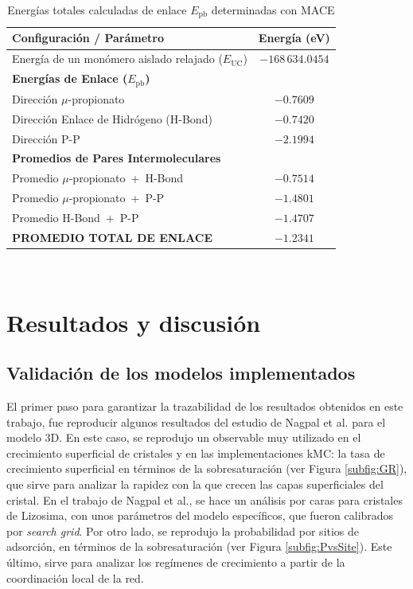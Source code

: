 \documentclass[12pt,letterpaper,oneside]{report}
\begin{document}
\begin{table}[h!]
    \centering
    \caption{Energías totales calculadas de enlace $E_{\text{pb}}$ determinadas con MACE}
    \label{tab:energias_hemozoin}
    \small
    \begin{tabular}{lc}
        \hline
        \textbf{Configuración / Parámetro} & \textbf{Energía (eV)} \\ \hline
        Energía de un monómero aislado relajado ($E_{\text{UC}}$) & $-168\,634.0454$ \\ [1ex]
        \textbf{Energías de Enlace ($E_{\text{pb}}$)} & \\
        \quad Dirección $\mu$-propionato & $-0.7609$ \\
        \quad Dirección Enlace de Hidrógeno (H-Bond) & $-0.7420$ \\
        \quad Dirección P-P & $-2.1994$ \\ [1ex]
        \textbf{Promedios de Pares Intermoleculares} & \\
        \quad Promedio $\mu$-propionato \,+\, H-Bond & $-0.7514$ \\
        \quad Promedio $\mu$-propionato \,+\, P-P & $-1.4801$ \\
        \quad Promedio H-Bond \,+\, P-P & $-1.4707$ \\ [1ex]
        \hline
        \textbf{PROMEDIO TOTAL DE ENLACE} & $\mathbf{-1.2341}$ \\ \hline
    \end{tabular}
    \label{table:MACE}
\end{table}\\

\chapter{Resultados y discusión}

\section{Validación de los modelos implementados}

El primer paso para garantizar la trazabilidad de los resultados obtenidos en este trabajo, fue reproducir algunos resultados del estudio de Nagpal et al. para el modelo 3D. En este caso, se reprodujo un observable muy utilizado en el crecimiento superficial de cristales y en las implementaciones kMC: la tasa de crecimiento superficial en términos de la sobresaturación (ver Figura \ref{subfig:GR}), que sirve para analizar la rapidez con la que crecen las capas superficiales del cristal. En el trabajo de Nagpal et al., se hace un análisis por caras para cristales de Lizosima, con unos parámetros del modelo específicos, que fueron calibrados por \textit{search grid}. Por otro lado, se reprodujo la probabilidad por sitios de adsorción, en términos de la sobresaturación (ver Figura \ref{subfig:PvsSite}). Este último, sirve para analizar los regímenes de crecimiento a partir de la coordinación local de la red.\\
\end{document}
